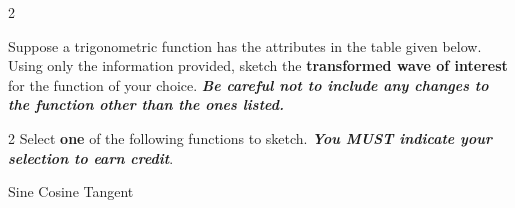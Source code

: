 \documentclass[11pt]{exam}
\begin{document}
\begin{questions}
\begin{multicols}{2}
\end{multicols}

\question[2]
Suppose a trigonometric function has the attributes in the table given below. Using only the information provided, sketch the \textbf{transformed wave of interest} for the function of your choice. \textit{\textbf{Be careful not to include any changes to the function other than the ones listed.}}

\begin{multicols}{2}
    Select \textbf{one} of the following functions to sketch. \textbf{\textit{You MUST indicate your selection to earn credit}}.
    \begin{checkboxes}
    \choice Sine   
    \choice Cosine    
    \choice Tangent
\end{checkboxes}

\columnbreak
{}

\end{multicols}

\vspace{0.25in}

\begin{center}
\end{center}
\vspace{0.25in}


\end{questions}
\end{document}

